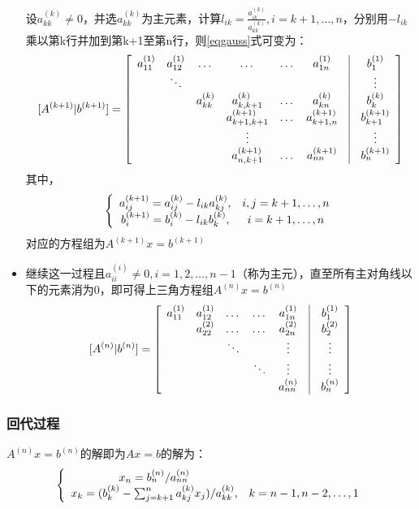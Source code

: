 \documentclass[a4paper]{article}
\begin{document}
\begin{itemize}
设$a^{(k)}_{kk}\neq 0$，并选$a^{(k)}_{kk}$为主元素，计算$l_{ik}=\frac{a^{(k)}_{ik}}{a^{(k)}_{kk}}, i=k+1, \dots, n$，分别用$-l_{ik}$乘以第k行并加到第k+1至第n行，则\ref{eqgauss}式可变为：
$$
[A^{(k+1)}|b^{(k+1)}]=\left[
\begin{array}{c c c c c c c c}
a^{(1)}_{11} & a^{(1)}_{12} & \dots & \dots &\dots &a^{(1)}_{1n} & \vline & b_1^{(1)} \\
~ & \ddots & ~ & ~ & ~ & ~ &\vline & \vdots \\
~ & ~ & a^{(k)}_{kk}  & a^{(k)}_{k,k+1}        & \dots & a^{(k)}_{kn} &\vline & b_k^{(k)} \\
~ & ~ & ~                & a^{(k+1)}_{k+1, k+1} & \dots & a^{(k+1)}_{k+1, n} & \vline & b_{k+1}^{(k+1)} \\
~ & ~ & ~                & \vdots                  &  ~   & ~ & \vline & \vdots \\
~ & ~ & ~ & a^{(k+1)}_{n, k+1} & \dots & a^{(k+1)}_{nn} & \vline & b_n^{(k+1)} \\ 
\end{array}\right] 
$$
其中，
$$ \left\{
\begin{array}{c c}
a^{(k+1)}_{ij} = a^{(k)}_{ij} - l_{ik}a^{(k)}_{kj}, &  i, j = k+1, \dots, n\\ 
b_i^{(k+1)} = b_i^{(k)} - l_{ik}b_k^{(k)}, & i=k+1,\dots, n \\
\end{array}\right.
$$
对应的方程组为$A^{(k+1)}x = b^{(k+1)}$
\item 继续这一过程且$a^{(i)}_{ii} \neq 0, i=1, 2, \dots, n-1$（称为主元），直至所有主对角线以下的元素消为0，即可得上三角方程组$A^{(n)}x=b^{(n)}$
$$
[A^{(n)}|b^{(n)}]=\left[
\begin{array}{c c c c c c c}
a^{(1)}_{11} & a^{(1)}_{12} & \dots & \dots & a^{(1)}_{1n}  & \vline & b_1^{(1)} \\
~             & a^{(2)}_{22} & \dots & \dots & a^{(2)}_{2n} &\vline & b_2^{(2)} \\
~             &    ~            & \ddots & ~       & \vdots        &\vline & \vdots \\
~             & ~               & ~ &\ddots     & \vdots        & \vline & \vdots \\
~             & ~               & ~         & ~      & a^{(n)}_{nn} & \vline & b_n^{(n)} \\ 
\end{array}\right] 
$$
\end{itemize}

\subsubsection{回代过程}
$A^{(n)}x=b^{(n)}$的解即为$Ax=b$的解为：
$$ \left\{
\begin{array}{c c}
x_n = b^{(n)}_n / a^{(n)}_{nn} &  ~\\ 
x_k = (b^{(k)}_k - \sum^n_{j=k+1}a^{(k)}_{kj}x_j) / a^{(k)}_{kk}, & k=n-1, n-2, \dots , 1 \\
\end{array}\right.
$$
\end{document}
